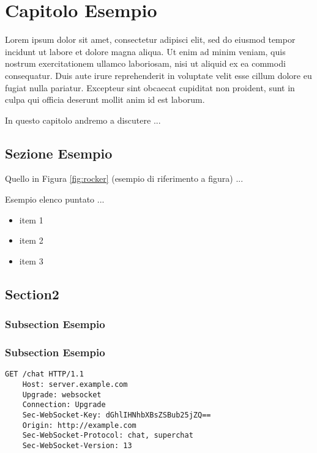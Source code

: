 \chapter{Capitolo Esempio}
\label{chap:Capitolo2}

Lorem ipsum dolor sit amet, consectetur adipisci elit, sed do eiusmod tempor incidunt ut labore et dolore magna aliqua. Ut enim ad minim veniam, quis nostrum exercitationem ullamco laboriosam, nisi ut aliquid ex ea commodi consequatur. Duis aute irure reprehenderit in voluptate velit esse cillum dolore eu fugiat nulla pariatur. Excepteur sint obcaecat cupiditat non proident, sunt in culpa qui officia deserunt mollit anim id est laborum.

In questo capitolo andremo a discutere ...
  
\section{Sezione Esempio}
\label{sec:real-time}
Quello in Figura \ref{fig:rocker}  (esempio di riferimento a figura) ...


Esempio elenco puntato ...
\begin{itemize}
	\item item 1
	\item item 2
	\item item 3
\end{itemize}


\section{Section2}

\subsection{Subsection Esempio}
\label{sec:handshake}

\subsection{Subsection Esempio}
\label{sec:handshake}

\begin{lstlisting}[caption={Esempio di listing}, style=javaScriptCode]
	GET /chat HTTP/1.1
	Host: server.example.com
	Upgrade: websocket
	Connection: Upgrade
	Sec-WebSocket-Key: dGhlIHNhbXBsZSBub25jZQ==
	Origin: http://example.com
	Sec-WebSocket-Protocol: chat, superchat
	Sec-WebSocket-Version: 13
\end{lstlisting} 


